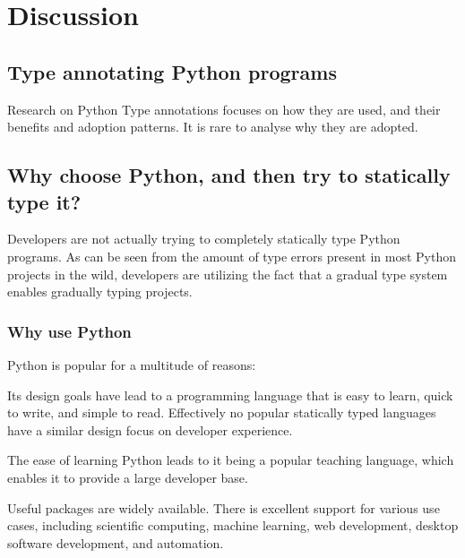 \chapter{Discussion\label{discussion}}


\section{Type annotating Python programs} 

Research on Python Type annotations focuses on how they are used, and their benefits and adoption patterns. It is rare to analyse why they are adopted.


\section{Why choose Python, and then try to statically type it?}

Developers are not actually trying to completely statically type Python programs. As can be seen from the amount of type errors present in most Python projects in the wild\cite{rak-amnouykit_taleoftwo_2020, di_grazia_evolution_2022}, developers are utilizing the fact that a gradual type system enables gradually typing projects.

\subsection{Why use Python}
Python is popular for a multitude of reasons:

Its design goals have lead to a programming language that is easy to learn, quick to write, and simple to read. Effectively no popular statically typed languages have a similar design focus on developer experience.

The ease of learning Python leads to it being a popular teaching language, which enables it to provide a large developer base.

Useful packages are widely available. There is excellent support for various use cases, including scientific computing, machine learning, web development, desktop software development, and automation. 

